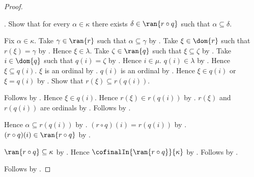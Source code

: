 \begin{proof}
\begin{subproof}
            .
        Show that for every $\alpha\in\kappa$ there exists
            $\delta\in\ran{r\circ q}$ such that $\alpha\subseteq\delta$.
        \begin{subproof}
            Fix $\alpha\in\kappa$.
            Take $\gamma\in\ran{r}$ such that $\alpha\subseteq\gamma$ by
                .
            Take $\xi\in\dom{r}$ such that $r(\xi)=\gamma$ by
                .
            Hence $\xi\in\lambda$.
            Take $\zeta\in\ran{q}$ such that $\xi\subseteq\zeta$ by
                .
            Take $i\in\dom{q}$ such that $q(i)=\zeta$ by
                .
            Hence $i\in\mu$.
            $q(i)\in\lambda$ by .
            Hence $\xi\subseteq q(i)$.
            $\xi$ is an ordinal by .
            $q(i)$ is an ordinal by .
            Hence $\xi\in q(i)$ or $\xi=q(i)$ by
                .
            Show that $r(\xi)\subseteq r(q(i))$.
            \begin{subproof}
                \begin{byCase}
                        Follows by .
                        Hence $\xi\in q(i)$.
                        Hence $r(\xi)\in r(q(i))$ by
                            .
                        $r(\xi)$ and $r(q(i))$ are ordinals by
                            .
                        Follows by .
                \end{byCase}
            \end{subproof}
            Hence $\alpha\subseteq r(q(i))$ by
                .
            $(r\circ q)(i)=r(q(i))$ by .
            $(r\circ q)(i)\in\ran{r\circ q}$ by
                .
        \end{subproof}
        $\ran{r\circ q}\subseteq\kappa$ by .
        Hence $\cofinalIn{\ran{r\circ q}}{\kappa}$ by
            .
        Follows by .
    \end{subproof}
    Follows by .
\end{proof}


